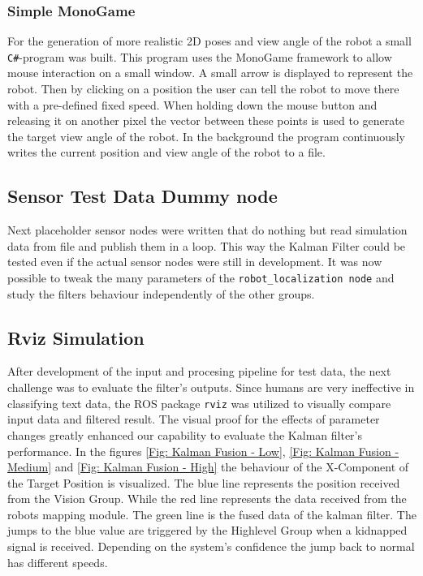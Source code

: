 \subsubsection{Simple MonoGame}
For the generation of more realistic 2D poses and view angle of the robot a small \texttt{C\#}-program was built. This program uses the MonoGame framework to allow mouse interaction on a small window. A small arrow is displayed to represent the robot. Then by clicking on a position the user can tell the robot to move there with a pre-defined fixed speed. When holding down the mouse button and releasing it on another pixel the vector between these points is used to generate the target view angle of the robot. In the background the program continuously writes the current position and view angle of the robot to a file.

\subsection{Sensor Test Data Dummy node}
Next placeholder sensor nodes were written that do nothing but read simulation data from file and publish them in a loop. This way the Kalman Filter could be tested even if the actual sensor nodes were still in development. It was now possible to tweak the many parameters of the \texttt{robot\_localization node} and study the filters behaviour independently of the other groups.

\subsection{Rviz Simulation}
After development of the input and procesing pipeline for test data, the next challenge was to evaluate the filter's outputs. Since humans are very ineffective in classifying text data, the ROS package \texttt{rviz} was utilized to visually compare input data and filtered result. The visual proof for the effects of parameter changes greatly enhanced our capability to evaluate the Kalman filter's performance. In the figures \ref{Fig: Kalman Fusion - Low}, \ref{Fig: Kalman Fusion - Medium} and \ref{Fig: Kalman Fusion - High} the behaviour of the X-Component of the Target Position is visualized. The blue line represents the position received from the Vision Group. While the red line represents the data received from the robots mapping module. The green line is the fused data of the kalman filter. The jumps to the blue value are triggered by the Highlevel Group when a kidnapped signal is received. Depending on the system's confidence the jump back to normal has different speeds.

